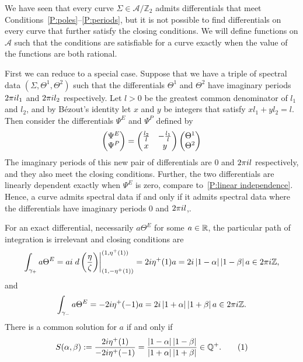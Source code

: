 \documentclass{article}
\begin{document}
We have seen that every curve $\Sigma\in\mathcal{A}/\mathbb{Z}_2$ admits differentials that meet Conditions~\ref{P:poles}--\ref{P:periods}, but it is not possible to find differentials on every curve that further satisfy the closing conditions. We will define functions on $\mathcal{A}$ such that the conditions are satisfiable for a curve exactly when the value of the functions are both rational.

First we can reduce to a special case. Suppose that we have a triple of spectral data $(\Sigma,\Theta^1,\Theta^2)$ such that the differentials $\Theta^1$ and $\Theta^2$ have imaginary periods $2\pi i l_1$ and $2\pi i l_2$ respectively. Let $l>0$ be the greatest common denominator of $l_1$ and $l_2$, and by Bézout's identity let $x$ and $y$ be integers that satisfy $xl_1 + yl_2 = l$. Then consider the differentials $\Psi^E$ and $\Psi^P$ defined by
\[
\begin{pmatrix} \Psi^E \\ \Psi^P \end{pmatrix} =
\begin{pmatrix}
\tfrac{l_2}{l}    &   -\tfrac{l_1}{l} \\
x                       &   y
\end{pmatrix}
\begin{pmatrix} \Theta^1 \\ \Theta^2 \end{pmatrix}
\]
The imaginary periods of this new pair of differentials are $0$ and $2\pi i l$ respectively, and they also meet the closing conditions. Further, the two differentials are linearly dependent exactly when $\Psi^E$ is zero, compare to~\ref{P:linear independence}. Hence, a curve admits spectral data if and only if it admits spectral data where the differentials have imaginary periods $0$ and $2\pi i l$,.

For an exact differential, necessarily $a\Theta^E$ for some $a\in\mathbb{R}$, the particular path of integration is irrelevant and closing conditions are
\[
\int_{\gamma_{+}} a\Theta^E = ai \left. d\left(\frac{\eta}{\zeta}\right) \right|_{(1, -\eta^+(1))}^{(1, \eta^+(1))} = 2i \eta^+(1)a = 2i \left|1-\alpha\right|\left|1-\beta\right|a \in 2\pi i \mathbb{Z},
\]
and 
\[
\int_{\gamma_{-}} a\Theta^E = -2i \eta^+(-1)a = 2i \left|1+\alpha\right|\left|1+\beta\right|a \in 2\pi i \mathbb{Z}.
\]
There is a common solution for $a$ if and only if
\[
S(\alpha,\beta) := \frac{2\iu \eta^+(1)}{-2\iu \eta^+(-1)} = \frac{\abs{1-\alpha}\abs{1-\beta}}{\abs{1+\alpha}\abs{1+\beta}} \in \Q^+.
\labelthis{eqn:def_S}
\]
\end{document}
